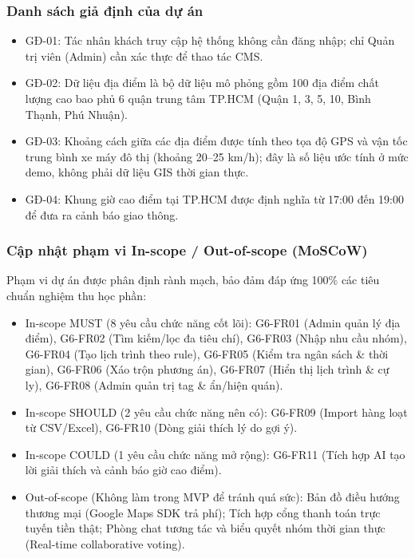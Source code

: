 \documentclass[13pt,a4paper]{extreport}
\begin{document}
\subsubsection{Danh sách giả định của dự án}
\begin{itemize}
    \item GĐ-01: Tác nhân khách truy cập hệ thống không cần đăng nhập; chỉ Quản trị viên (Admin) cần xác thực để thao tác CMS.
    \item GĐ-02: Dữ liệu địa điểm là bộ dữ liệu mô phỏng gồm 100 địa điểm chất lượng cao bao phủ 6 quận trung tâm TP.HCM (Quận 1, 3, 5, 10, Bình Thạnh, Phú Nhuận).
    \item GĐ-03: Khoảng cách giữa các địa điểm được tính theo tọa độ GPS và vận tốc trung bình xe máy đô thị (khoảng 20--25 km/h); đây là số liệu ước tính ở mức demo, không phải dữ liệu GIS thời gian thực.
    \item GĐ-04: Khung giờ cao điểm tại TP.HCM được định nghĩa từ 17:00 đến 19:00 để đưa ra cảnh báo giao thông.
\end{itemize}

\subsubsection{Cập nhật phạm vi In-scope / Out-of-scope (MoSCoW)}
Phạm vi dự án được phân định rành mạch, bảo đảm đáp ứng 100\% các tiêu chuẩn nghiệm thu học phần:
\begin{itemize}
    \item In-scope MUST (8 yêu cầu chức năng cốt lõi): G6-FR01 (Admin quản lý địa điểm), G6-FR02 (Tìm kiếm/lọc đa tiêu chí), G6-FR03 (Nhập nhu cầu nhóm), G6-FR04 (Tạo lịch trình theo rule), G6-FR05 (Kiểm tra ngân sách \& thời gian), G6-FR06 (Xáo trộn phương án), G6-FR07 (Hiển thị lịch trình \& cự ly), G6-FR08 (Admin quản trị tag \& ẩn/hiện quán).
    \item In-scope SHOULD (2 yêu cầu chức năng nên có): G6-FR09 (Import hàng loạt từ CSV/Excel), G6-FR10 (Dòng giải thích lý do gợi ý).
    \item In-scope COULD (1 yêu cầu chức năng mở rộng): G6-FR11 (Tích hợp AI tạo lời giải thích và cảnh báo giờ cao điểm).
    \item Out-of-scope (Không làm trong MVP để tránh quá sức): Bản đồ điều hướng thương mại (Google Maps SDK trả phí); Tích hợp cổng thanh toán trực tuyến tiền thật; Phòng chat tương tác và biểu quyết nhóm thời gian thực (Real-time collaborative voting).
\end{itemize}
\end{document}
